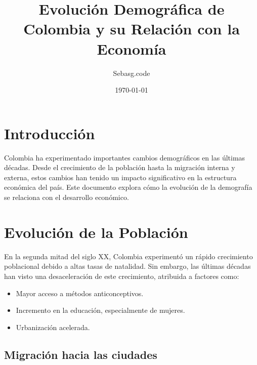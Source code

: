 \documentclass{article}
\title{Evolución Demográfica de Colombia y su Relación con la Economía}
\author{Sebasg.code}
\date{\today}
\begin{document}
\maketitle

\section{Introducción}

Colombia ha experimentado importantes cambios demográficos en las últimas décadas. Desde el crecimiento de la población hasta la migración interna y externa, estos cambios han tenido un impacto significativo en la estructura económica del país. Este documento explora cómo la evolución de la demografía se relaciona con el desarrollo económico.

\section{Evolución de la Población}

En la segunda mitad del siglo XX, Colombia experimentó un rápido crecimiento poblacional debido a altas tasas de natalidad. Sin embargo, las últimas décadas han visto una desaceleración de este crecimiento, atribuida a factores como:

\begin{itemize}
    \item Mayor acceso a métodos anticonceptivos.
    \item Incremento en la educación, especialmente de mujeres.
    \item Urbanización acelerada.
\end{itemize}


\subsection{Migración hacia las ciudades}
\end{document}
